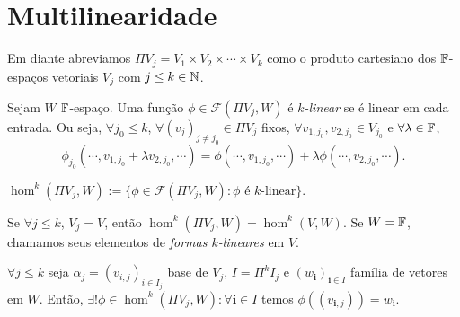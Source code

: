 \section{Multilinearidade}

Em diante abreviamos \(\Pi V_j = V_1 \times V_2 \times \cdots \times V_k\) como o produto cartesiano dos \(\mathbb{F}\)-espaços vetoriais \(V_j\) com \(j\leq k \in \mathbb{N}\). 
\begin{definition}
    Sejam \(W\) \(\mathbb{F}\)-espaço. Uma função \(\phi \in \mathcal{F}( \Pi V_j, W)\) é $k$\emph{-linear} se é linear em cada entrada. Ou seja, \(\forall j_0\leq k\), \(\forall (v_j)_{j\neq j_0}\in \Pi V_j \) fixos, \(\forall v_{1,j_0}, v_{2,j_0} \in V_{j_0} \) e \( \forall \lambda \in \mathbb{F}\),   
    \[  \textstyle \phi_{j_0} (\cdots, v_{1,j_0} + \lambda v_{2,j_0}, \cdots ) = \phi ( \cdots, v_{1,j_0}, \cdots) + \lambda \phi(\cdots, v_{2,j_0}, \cdots ).\]  
\end{definition}

\vspace{-0.5cm}
\begin{definition}
    \centering \(\hom^k(\Pi V_j,W):= \{\phi \in \mathcal{F}(\Pi V_j, W): \phi \text{ é $k$-linear}\}\).
\end{definition}

\begin{note}
    Se \(\forall j\leq k\), \(V_j =V\), então \(\hom^k(\Pi V_j,W) = \hom^k(V,W)\). Se \(W = \mathbb{F} \), chamamos seus elementos de \emph{formas $k$-lineares} em \(V\). 
\end{note}


\begin{theorem}
    \label{thm:9.1.3}
    \(\forall j\leq k\) seja \(\alpha_j = (v_{i,j})_{i \in I_j}\) base de \(V_j\), \(I = \Pi^k I_j\) e \((w_\textbf{i})_{\textbf{i} \in I}\) família de vetores em \(W\). Então, \(\exists ! \phi \in \hom^k(\Pi V_j, W):\forall \textbf{i} \in I\) temos \(\phi((v_{\textbf{i}, j})) = w_\textbf{i}\). 
\end{theorem}

